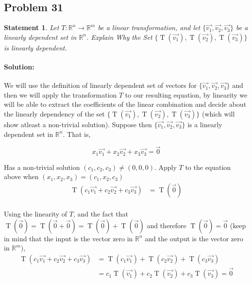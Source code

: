 \documentclass[12pt, letterpaper]{article}
\newcommand{\R}{\mathbb{R}}
\theoremstyle{statement}
\theoremstyle{statement}
\newtheorem*{atmStat}{Statement}
\newenvironment{Solution}{\noindent\ignorespaces\paragraph{Solution:}}{\hfill \ding{122}\par\noindent}
\begin{document}
        \subsection*{Problem 31}
        \begin{atmStat}
        Let $T: \R^n \longrightarrow \R^m$ be a linear transformation, and let $\{\Vec{v_1}, \Vec{v_2}, \Vec{v_3} \}$ be a linearly dependent set in $\R^n$. Explain Why the Set $\{ \operatorname{T}(\Vec{v_1}), \operatorname{T}(\Vec{v_2}), \operatorname{T}(\Vec{v_3})\}$ is linearly dependent.
     
        \end{atmStat}
        \begin{Solution}
        We will use the definition of linearly dependent set of vectors for $\{\Vec{v_1}, \Vec{v_2}, \Vec{v_3} \}$ and then we will apply the transformation $T$ to our resulting equation, by linearity we will be able to extract the coefficients of the linear combination and decide about the linearly dependency of the set $\{ \operatorname{T}(\Vec{v_1}), \operatorname{T}(\Vec{v_2}), \operatorname{T}(\Vec{v_3})\}$ (which will show atleast a non-trivial solution). Suppose then $\{\Vec{v_1}, \Vec{v_2}, \Vec{v_3} \}$ is a linearly dependent set in $\R^n$. That is, 
        
        $$x_1\Vec{v_1} + x_2\Vec{v_2} + x_3\Vec{v_3} = \Vec{0}$$
        
        Has a non-trivial solution $(c_1, c_2, c_3) \neq (0, 0, 0)$. Apply $T$ to the equation above when $(x_1, x_2, x_3) = (c_1, x_2, c_3)$
        \begin{align*}
            \operatorname{T}(c_1\Vec{v_1} + c_2\Vec{v_2} + c_3\Vec{v_3})
            & = \operatorname{T}(\Vec{0}) \\
        \end{align*}
        
        Using the linearity of $T$, and the fact that $\operatorname{T}(\Vec{0}) = \operatorname{T}(\Vec{0} + \Vec{0}) = \operatorname{T}(\Vec{0}) + \operatorname{T}(\Vec{0})$ and therefore $\operatorname{T}(\Vec{0}) = \Vec{0}$ (keep in mind that the input is the vector zero in $\R^n$ and the output is the vector zero in $\R^m$),
        \begin{align*}
            \operatorname{T}(c_1\Vec{v_1} + c_2\Vec{v_2} + c_3\Vec{v_3})
            & = \operatorname{T}(c_1\Vec{v_1})
            + \operatorname{T}(c_2\Vec{v_2}) 
            + \operatorname{T}(c_3\Vec{v_3}) \\
            & = c_1 \operatorname{T}(\Vec{v_1})
            + c_2 \operatorname{T}(\Vec{v_2})
            + c_3 \operatorname{T}(\Vec{v_3}) = \Vec{0}
        \end{align*}
        

\end{Solution}
\end{document}
